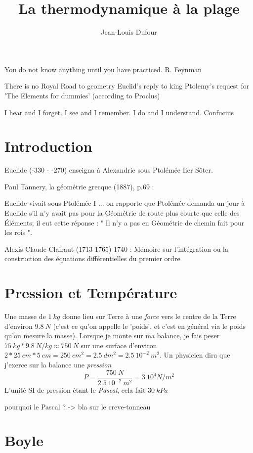 \documentclass[11pt]{article} %
\title{La thermodynamique à la plage}
\author{Jean-Louis Dufour}
\begin{document}
\maketitle

You do not know anything until you have practiced.
R. Feynman

There is no Royal Road to geometry
Euclid's reply to king Ptolemy's request for 'The Elements for dummies' (according to Proclus)

I hear and I forget. I see and I remember. I do and I understand.
Confucius

\section{Introduction}

Euclide (-330 - -270) enseigna à Alexandrie sous Ptolémée Iier Sôter.

Paul Tannery, la géométrie grecque (1887), p.69 :

Euclide vivait sous Ptolémée I ...
on rapporte que Ptolémée demanda un jour à Euclide
s'il n’y avait pas pour la Géométrie de route plus courte que celle des Éléments;
il eut cette réponse : " Il n’y a pas en Géométrie de chemin fait pour les rois ".

Alexis-Claude Clairaut (1713-1765)
1740 : Mémoire sur l'intégration ou la construction des équations différentielles du premier ordre






\section{Pression et Température}

Une masse de $1~kg$ donne lieu sur Terre à une \emph{force} vers le centre de la Terre d'environ $9.8~N$ (c'est ce qu'on appelle le 'poids', et c'est en général via le poids qu'on mesure la masse).
Lorsque je monte sur ma balance, je fais peser $75~kg * 9.8~N/kg \approx 750~N $ sur une surface d'environ $2*25~cm*5~cm = 250~cm^2 = 2.5~dm^2 = 2.5~10^{-2}~m^2$. Un physicien dira que j'exerce sur la balance une \emph{pression}
$$
P = \frac{750~N}{2.5~10^{-2}~m^2} = 3~10^4 N/m^2 
$$
L'unité SI de pression étant le \emph{Pascal}, cela fait $30~kPa$

pourquoi le Pascal ? -> bla sur le creve-tonneau

\section{Boyle}
\end{document}
